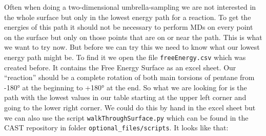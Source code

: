 \documentclass[a4paper,11pt]{scrartcl}
\begin{document}
Often when doing a two-dimensional umbrella-sampling we are not interested in the whole surface but only in the lowest energy path for a reaction. To get the energies of this path it should not be necessary to perform MDs on every point on the surface but only on those points that are on or near the path. This is what we want to try now. But before we can try this we need to know what our lowest energy path might be. To find it we open the file \texttt{freeEnergy.csv} which was created before. It contains the Free Energy Surface as an excel sheet. Our ``reaction'' should be a complete rotation of both main torsions of pentane from -180° at the beginning to +180° at the end. So what we are looking for is the path with the lowest values in our table starting at the upper left corner and going to the lower right corner. We could do this by hand in the excel sheet but we can also use the script \texttt{walkThroughSurface.py} which can be found in the CAST repository in folder \texttt{optional\_files/scripts}. It looks like that:
\end{document}
